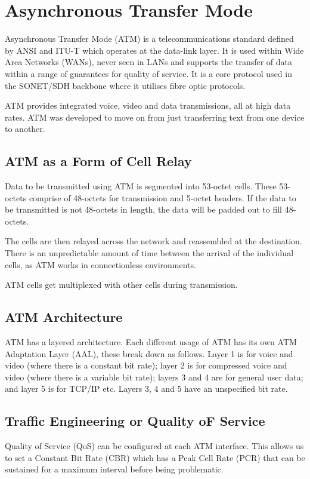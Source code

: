 
\section*{Asynchronous Transfer Mode}
Asynchronous Transfer Mode (ATM) is a telecommunications standard defined by ANSI and ITU-T which operates at the data-link layer. It is used within Wide Area Networks (WANs), never seen in LANs and supports the transfer of data within a range of guarantees for quality of service. It is a core protocol used in the SONET/SDH backbone where it utilises fibre optic protocols.

ATM provides integrated voice, video and data transmissions, all at high data rates. ATM was developed to move on from just transferring text from one device to another. 

\subsection*{ATM as a Form of Cell Relay}
Data to be transmitted using ATM is segmented into 53-octet cells. These 53-octets comprise of 48-octets for transmission and 5-octet headers. If the data to be transmitted is not 48-octets in length, the data will be padded out to fill 48-octets. 

The cells are then relayed across the network and reassembled at the destination. There is an unpredictable amount of time between the arrival of the individual cells, as ATM works in connectionless environments. 

ATM cells get multiplexed with other cells during transmission. 

\subsection*{ATM Architecture}
ATM has a layered architecture. Each different usage of ATM has its own ATM Adaptation Layer (AAL), these break down as follows. Layer 1 is for voice and video (where there is a constant bit rate); layer 2 is for compressed voice and video (where there is a variable bit rate); layers 3 and 4 are for general user data; and layer 5 is for TCP/IP etc. Layers 3, 4 and 5 have an unspecified bit rate.

\subsection*{Traffic Engineering or Quality oF Service}
Quality of Service (QoS) can be configured at each ATM interface. This allows us to set a Constant Bit Rate (CBR) which has a Peak Cell Rate (PCR) that can be sustained for a maximum interval before being problematic.

